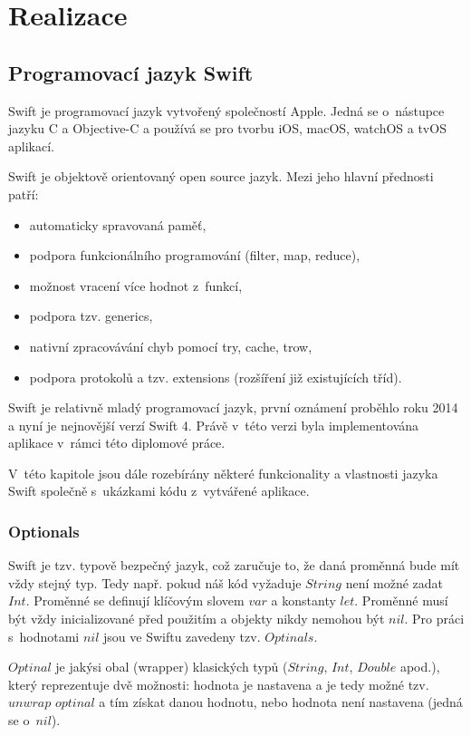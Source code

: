 \documentclass[thesis=M,czech]{FITthesis}[2012/06/26]
\begin{document}
\chapter{Realizace}
\label{chap:realizace}

\section{Programovací jazyk Swift}
Swift je programovací jazyk vytvořený společností Apple. Jedná se o~nástupce jazyku C a Objective-C a používá se pro tvorbu iOS, macOS, watchOS a tvOS aplikací.

Swift je objektově orientovaný open source jazyk. Mezi jeho hlavní přednosti patří: 
\begin{itemize}
\item automaticky spravovaná paměť,
\item podpora funkcionálního programování (filter, map, reduce),
\item možnost vracení  více  hodnot z~funkcí,
\item podpora tzv. generics,
\item nativní zpracovávání chyb pomocí try, cache, trow,
\item podpora protokolů a tzv. extensions (rozšíření již existujících tříd). \cite{swift}
\end{itemize}

Swift je relativně mladý programovací jazyk, první oznámení proběhlo roku 2014 a nyní je nejnovější verzí Swift 4. Právě v~této verzi byla implementována aplikace v~rámci této diplomové práce. \cite{swift2}

V~této kapitole jsou dále rozebírány některé funkcionality a vlastnosti jazyka Swift společně s~ukázkami kódu z~vytvářené aplikace.

\subsection{Optionals}
Swift je tzv. typově bezpečný jazyk, což zaručuje to, že daná proměnná bude mít vždy stejný typ. Tedy např. pokud náš kód vyžaduje $String$ není možné zadat $Int$. 
Proměnné se definují klíčovým slovem $var$ a konstanty $let$. Proměnné musí být vždy inicializované před použitím a objekty nikdy nemohou být $nil$. Pro práci s~hodnotami $nil$ jsou ve Swiftu zavedeny tzv. $Optinals$.

$Optinal$ je jakýsi obal (wrapper) klasických typů ($String$, $Int$, $Double$ apod.), který reprezentuje dvě možnosti: hodnota je nastavena a je tedy možné tzv. $unwrap$ $optinal$ a tím získat danou hodnotu, nebo hodnota není nastavena (jedná se o~$nil$). \cite{devBasics}
\end{document}
